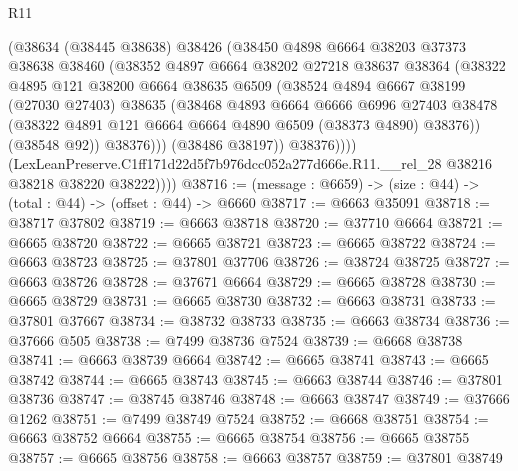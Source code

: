 \begin{lexlean}{R11}
\begin{coremodule}
                  (@38634
                    (@38445 @38638)
                    @38426
                    (@38450
                      @4898
                      @6664
                      @38203
                      @37373
                      @38638
                      @38460
                      (@38352
                        @4897
                        @6664
                        @38202
                        @27218
                        @38637
                        @38364
                        (@38322
                          @4895
                          @121
                          @38200
                          @6664
                          @38635
                          @6509
                          (@38524
                            @4894
                            @6667
                            @38199
                            (@27030 @27403)
                            @38635
                            (@38468
                              @4893
                              @6664
                              @6666
                              @6996
                              @27403
                              @38478
                              (@38322 @4891 @121 @6664 @6664 @4890 @6509 (@38373 @4890) @38376))
                            (@38548 @92))
                          @38376)))
                    (@38486 @38197))
                  @38376))))
          (LexLeanPreserve.C1ff171d22d5f7b976dcc052a277d666e.R11.__rel_28
            @38216
            @38218
            @38220
            @38222))))
@38716 := (message : @6659) -> (size : @44) -> (total : @44) -> (offset : @44) -> @6660
@38717 := @6663 @35091
@38718 := @38717 @37802
@38719 := @6663 @38718
@38720 := @37710 @6664
@38721 := @6665 @38720
@38722 := @6665 @38721
@38723 := @6665 @38722
@38724 := @6663 @38723
@38725 := @37801 @37706
@38726 := @38724 @38725
@38727 := @6663 @38726
@38728 := @37671 @6664
@38729 := @6665 @38728
@38730 := @6665 @38729
@38731 := @6665 @38730
@38732 := @6663 @38731
@38733 := @37801 @37667
@38734 := @38732 @38733
@38735 := @6663 @38734
@38736 := @37666 @505
@38738 := @7499 @38736 @7524
@38739 := @6668 @38738
@38741 := @6663 @38739 @6664
@38742 := @6665 @38741
@38743 := @6665 @38742
@38744 := @6665 @38743
@38745 := @6663 @38744
@38746 := @37801 @38736
@38747 := @38745 @38746
@38748 := @6663 @38747
@38749 := @37666 @1262
@38751 := @7499 @38749 @7524
@38752 := @6668 @38751
@38754 := @6663 @38752 @6664
@38755 := @6665 @38754
@38756 := @6665 @38755
@38757 := @6665 @38756
@38758 := @6663 @38757
@38759 := @37801 @38749

\end{coremodule}
\end{lexlean}
